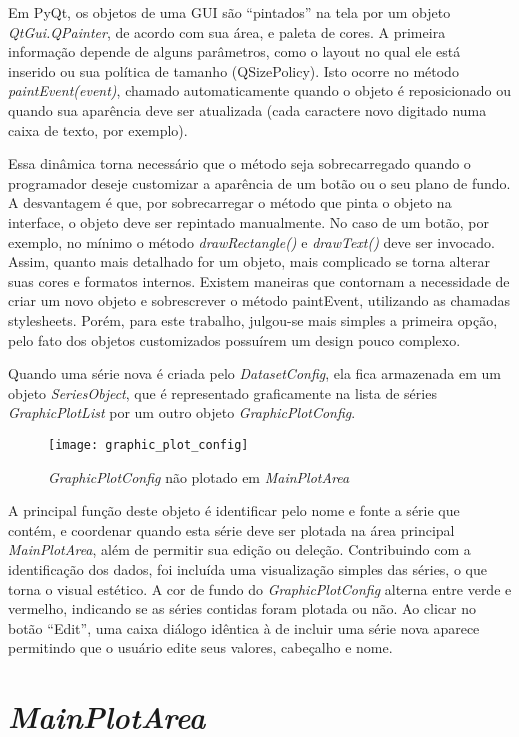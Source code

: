 Em PyQt, os objetos de uma GUI são “pintados” na tela por um objeto \emph{QtGui.QPainter}, de acordo com sua área, e paleta de cores. A primeira informação depende de alguns parâmetros, como o layout no qual ele está inserido ou sua política de tamanho (QSizePolicy). Isto ocorre no método \emph{paintEvent(event)}, chamado automaticamente quando o objeto é reposicionado ou quando sua aparência deve ser atualizada (cada caractere novo digitado numa caixa de texto, por exemplo).

Essa dinâmica torna necessário que o método seja sobrecarregado quando o programador deseje customizar a aparência de um botão ou o seu plano de fundo. A desvantagem é que, por sobrecarregar o método que pinta o objeto na interface, o objeto deve ser repintado manualmente. No caso de um botão, por exemplo, no mínimo o método \emph{drawRectangle()} e \emph{drawText()} deve ser invocado. Assim, quanto mais detalhado for um objeto, mais complicado se torna alterar suas cores e formatos internos. Existem maneiras que contornam a necessidade de criar um novo objeto e sobrescrever o método paintEvent, utilizando as chamadas stylesheets. Porém, para este trabalho, julgou-se mais simples a primeira opção, pelo fato dos objetos customizados possuírem um design pouco complexo.

Quando uma série nova é criada pelo \emph{DatasetConfig}, ela fica armazenada em um objeto \emph{SeriesObject}, que é representado graficamente na lista de séries \emph{GraphicPlotList} por um outro objeto \emph{GraphicPlotConfig}.

\begin{figure}[H]
	\centering
	\texttt{[image: graphic\_plot\_config]}
	\caption{\emph{GraphicPlotConfig} não plotado em \emph{MainPlotArea}}
	\label{img_graphic_plot_config}
\end{figure}

A principal função deste objeto é identificar pelo nome e fonte a série que contém, e coordenar quando esta série deve ser plotada na área principal \emph{MainPlotArea}, além de permitir sua edição ou deleção. Contribuindo com a identificação dos dados, foi incluída uma visualização simples das séries, o que torna o visual estético. A cor de fundo do \emph{GraphicPlotConfig} alterna entre verde e vermelho, indicando se as séries contidas foram plotada ou não. Ao clicar no botão “Edit”, uma caixa diálogo idêntica à de incluir uma série nova aparece permitindo que o usuário edite seus valores, cabeçalho e nome.

\section{\emph{MainPlotArea}}

